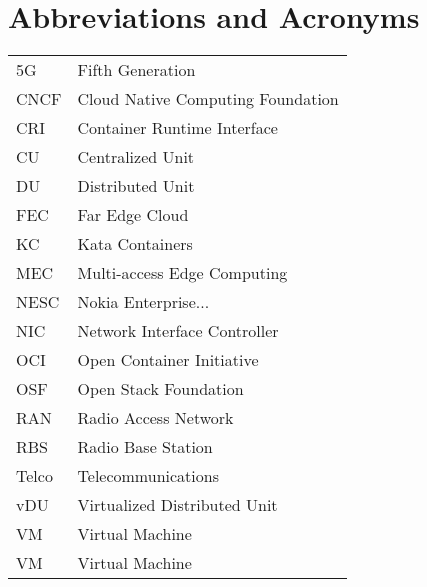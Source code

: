 \chapter*{Abbreviations and Acronyms}

\noindent
\begin{longtable}{@{}p{}p{}@{}}
5G & Fifth Generation \\
CNCF & Cloud Native Computing Foundation \\
CRI & Container Runtime Interface \\
CU & Centralized Unit \\
DU & Distributed Unit \\
FEC & Far Edge Cloud \\
KC & Kata Containers \\
MEC & Multi-access Edge Computing \\
NESC & Nokia Enterprise... \\
NIC & Network Interface Controller \\
OCI & Open Container Initiative \\
OSF & Open Stack Foundation \\
RAN & Radio Access Network \\
RBS & Radio Base Station \\
Telco & Telecommunications \\
vDU & Virtualized Distributed Unit \\
VM & Virtual Machine \\
VM & Virtual Machine \\



\end{longtable}
